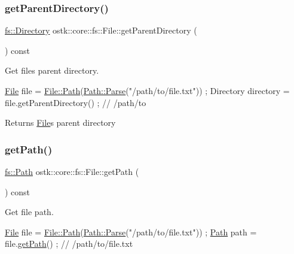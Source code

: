 \subsubsection{\texorpdfstring{get\+Parent\+Directory()}{getParentDirectory()}}
{\footnotesize\ttfamily \hyperlink{classostk_1_1core_1_1fs_1_1_directory}{fs\+::\+Directory} ostk\+::core\+::fs\+::\+File\+::get\+Parent\+Directory (\begin{DoxyParamCaption}{ }\end{DoxyParamCaption}) const}



Get file\textquotesingle{}s parent directory. 


\begin{DoxyCode}
\hyperlink{classostk_1_1core_1_1fs_1_1_file_ad1695224996950be9962b8457da369b3}{File} file = \hyperlink{classostk_1_1core_1_1fs_1_1_file_ad677c6a3edc1e88c18226edebff1da03}{File::Path}(\hyperlink{classostk_1_1core_1_1fs_1_1_path_ad08539ba654f5df11c4bcb07276345ad}{Path::Parse}(\textcolor{stringliteral}{"/path/to/file.txt"})) ;
Directory directory = file.getParentDirectory() ; \textcolor{comment}{// /path/to}
\end{DoxyCode}


\begin{DoxyReturn}{Returns}
\hyperlink{classostk_1_1core_1_1fs_1_1_file}{File}\textquotesingle{}s parent directory 
\end{DoxyReturn}
\mbox{\label{classostk_1_1core_1_1fs_1_1_file_a4bdf46eada08ce70e2a408606aab94e4}} 
\subsubsection{\texorpdfstring{get\+Path()}{getPath()}}
{\footnotesize\ttfamily \hyperlink{classostk_1_1core_1_1fs_1_1_path}{fs\+::\+Path} ostk\+::core\+::fs\+::\+File\+::get\+Path (\begin{DoxyParamCaption}{ }\end{DoxyParamCaption}) const}



Get file path. 


\begin{DoxyCode}
\hyperlink{classostk_1_1core_1_1fs_1_1_file_ad1695224996950be9962b8457da369b3}{File} file = \hyperlink{classostk_1_1core_1_1fs_1_1_file_ad677c6a3edc1e88c18226edebff1da03}{File::Path}(\hyperlink{classostk_1_1core_1_1fs_1_1_path_ad08539ba654f5df11c4bcb07276345ad}{Path::Parse}(\textcolor{stringliteral}{"/path/to/file.txt"})) ;
\hyperlink{classostk_1_1core_1_1fs_1_1_file_ad677c6a3edc1e88c18226edebff1da03}{Path} path = file.\hyperlink{classostk_1_1core_1_1fs_1_1_file_a4bdf46eada08ce70e2a408606aab94e4}{getPath}() ; \textcolor{comment}{// /path/to/file.txt}
\end{DoxyCode}


